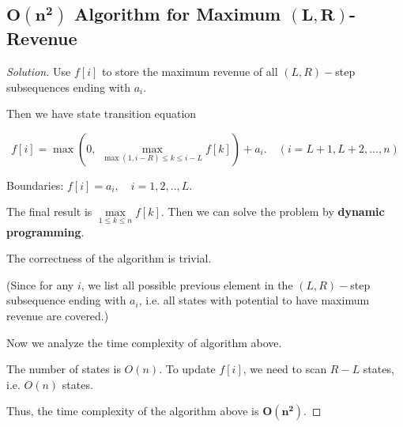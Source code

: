 \documentclass{article}
\newenvironment{solution}{\begin{proof}[\noindent\it Solution]}{\end{proof}}
\begin{document}
\subsection{$\boldsymbol{O(n^2)}$ Algorithm for Maximum $\boldsymbol{(L,R)}$-Revenue}
\vspace{0.751em}
\begin{solution}
    Use $f[i]$ to store the maximum revenue of all $(L,R)-$step subsequences ending with $a_i$.
    
    \hspace{2.6em}
    Then we have state transition equation
    
    \vspace{-1em}
    $$f[i]=\max\left(0,\ \underset{\max(1,i-R)\le k \le i-L}{\max}f[k]\right)+a_i.\quad(i=L+1, L+2, ..., n)$$
    
    \hspace{2.6em}
    Boundaries: $f[i]=a_i,\quad i=1,2,..,L$.
    
    \hspace{2.6em}
    The final result is $\underset{1\le k\le n}{\max}f[k]$. Then we can solve the problem by \textbf{dynamic programming}. 
    
    \vspace{1em} \hspace{2.6em}
    The correctness of the algorithm is trivial.
    
    \hspace{2.6em}
    (Since for any $i$, we list all possible previous element in the $(L,R)-$step subsequence ending with $a_i$, i.e. all states with potential to have maximum revenue are covered.)
    
    \vspace{1em} \hspace{2.6em}
    Now we analyze the time complexity of algorithm above.
    
    \hspace{2.6em}
    The number of states is $O(n)$. To update $f[i]$, we need to scan $R-L$ states, i.e. $O(n)$ states.
    
    \hspace{2.6em}
    Thus, the time complexity of the algorithm above is \underline{$\boldsymbol{O(n^2)}$}.
\end{solution}

\vspace{1em}
\end{document}
